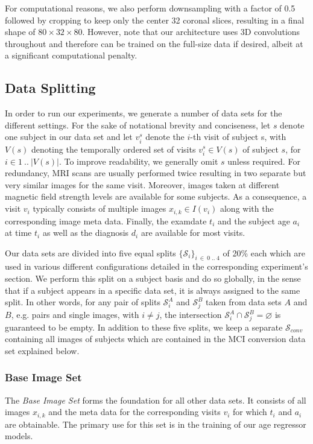 For computational reasons, we also perform downsampling with a factor of 0.5 followed by cropping to keep only the center 32 coronal slices, resulting in a final shape of $ 80 \times 32 \times 80 $. However, note that our architecture uses 3D convolutions throughout and therefore can be trained on the full-size data if desired, albeit at a significant computational penalty.

\subsection{Data Splitting} \label{sec:dat}
In order to run our experiments, we generate a number of data sets for the different settings. For the sake of notational brevity and conciseness, let $s$ denote one subject in our data set and let $v^s_i$ denote the $i$-th visit of subject s, with $V(s)$ denoting the temporally ordered set of visits $v^s_i \in V(s)$ of subject $s$, for $i \in 1 \ ..\ |V(s)|$. To improve readability, we generally omit $s$ unless required. For redundancy, MRI scans are usually performed twice resulting in two separate but very similar images for the same visit. Moreover, images taken at different magnetic field strength levels are available for some subjects. As a consequence, a visit $v_i$ typically consists of multiple images $x_{i, k} \in I(v_i)$ along with the corresponding image meta data. Finally, the examdate $t_i$ and the subject age $a_i$ at time $t_i$ as well as the diagnosis $d_i$ are available for most visits.

Our data sets are divided into five equal splits $ \{ \mathcal{S}_i \}_{i\ \in\ 0\;..\;4} $ of 20\% each which are used in various different configurations detailed in the corresponding experiment's section. We perform this split on a subject basis and do so globally, in the sense that if a subject appears in a specific data set, it is always assigned to the same split. In other words, for any pair of splits $ \mathcal{S}_i^A $ and $ \mathcal{S}_j^B $ taken from data sets $A$ and $B$, e.g. pairs and single images, with $ i \neq j $, the intersection $ { \mathcal{S}_i^A \cap \mathcal{S}_j^B = \varnothing } $ is guaranteed to be empty. In addition to these five splits, we keep a separate $\mathcal{S}_{conv}$ containing all images of subjects which are contained in the MCI conversion data set explained below.

\subsubsection*{Base Image Set} \label{sec:datsingles}
The \textit{Base Image Set} forms the foundation for all other data sets. It consists of all images $x_{i, k}$ and the meta data for the corresponding visits $v_i$ for which $t_i$ and $a_i$ are obtainable. The primary use for this set is in the training of our age regressor models.

